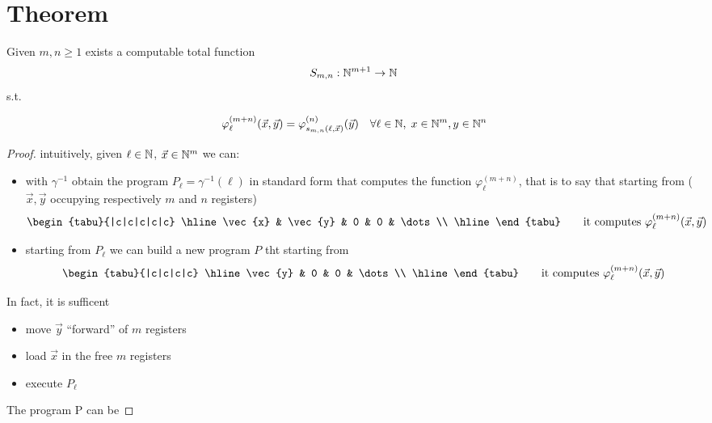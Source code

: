 \section{\smn Theorem}
\begin{theorem}
  Given $m, n \geq 1$ exists a computable total function
  \[S_{m,n} : \mathbb{N}^{m+1} \rightarrow \mathbb{N}\] s.t.

  \[
    \varphi_\ell^{(m+n)}(\vec{x},\vec{y}) = \varphi_{s_{m,n}(\ell,
      \vec{x})}^{(n)}(\vec{y}) \quad \forall \ell \in \mathbb{N}, \; x \in
    \mathbb{N}^m, y \in \mathbb{N}^n
  \]

  \begin{proof}
    intuitively, given $\ell \in \mathbb{N}$, $\vec{x}\in \mathbb{N}^m$ we can:
    \begin{itemize}
    \item with $\gamma^{-1}$ obtain the program
      $P_\ell = \gamma^{-1}(\ell)$ in standard form that computes the
      function $\varphi_\ell^{(m+n)}$, that is to say that starting
      from ( $\vec{x}, \vec{y}$ occupying respectively $m$ and $n$
      registers)
      \[
        \begin{tabu}{|c|c|c|c|c}
          \hline
          \vec{x} & \vec{y} & 0 & 0 & \dots \\ \hline
        \end{tabu}
        \quad \quad \mbox{it computes }
        \varphi_\ell^{(m+n)}(\vec{x},\vec{y})
      \]
    \item starting from $P_\ell$ we can build a new program $P$ tht
      starting from
      \[
        \begin{tabu}{|c|c|c|c}
          \hline
          \vec{y} & 0 & 0 & \dots \\ \hline
        \end{tabu}
        \quad \quad \mbox{it computes }
        \varphi_\ell^{(m+n)}(\vec{x},\vec{y})
      \]
    \end{itemize}

    In fact, it is sufficent
    \begin{itemize}
    \item move $\vec{y}$ ``forward'' of $m$ registers
    \item load $\vec{x}$ in the free $m$ registers
    \item execute $P_\ell$
    \end{itemize}
    
    The program P can be


\end{proof}
\end{theorem}
